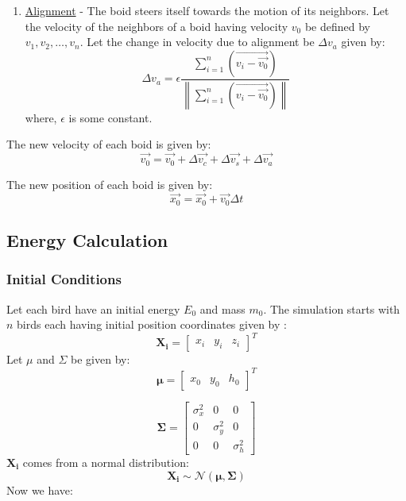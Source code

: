 \documentclass[a4paper]{article}
\newcommand\norm[1]{\left\lVert#1\right\rVert}
\begin{document}
\begin{enumerate}

\item\underline{Alignment} - The boid steers itself towards the motion of its neighbors. Let the velocity of the neighbors of a boid having velocity $v_{0}$ be defined by $v_{1}, v_{2}, \ldots, v_{n}$. Let the change in velocity due to alignment be $\Delta v_{a}$ given by:
\[ \Delta v_{a} = \epsilon \frac{\sum_{i=1}^{n}(\vec{v_{i} - \vec{v_{0}}})}{\norm{\sum_{i=1}^{n}(\vec{v_{i} - \vec{v_{0}}})}} \]
where, $\epsilon$ is some constant.


\end{enumerate}

The new velocity of each boid is given by:
\[ \vec{v_{0}} = \vec{v_{0}} + \Delta \vec{v_{c}} + \Delta \vec{v_{s}}+ \Delta \vec{v_{a}} \]

The new position of each boid is given by:
\[ \vec{x_{0}} = \vec{x_{0}} + \vec{v_{0}}\Delta t  \]

\subsection{Energy Calculation}

\subsubsection{Initial Conditions}

Let each bird have an initial energy $E_{0}$ and mass $m_{0}$.
The simulation starts with $n$ birds each having initial position coordinates  given by :
\[ \boldsymbol{X_{i}} =  \begin{bmatrix} x_{i} & y_{i} & z_{i} \end{bmatrix} ^{T} \]
Let $\mu$ and $\Sigma$ be given by:
\[ \boldsymbol\mu =  \begin{bmatrix} x_{0} & y_{0} & h_{0} \end{bmatrix} ^{T} \]

\[ \boldsymbol\Sigma =  \begin{bmatrix} 
\sigma_{x}^{2} & 0 & 0 \\
0 & \sigma_{y}^{2} & 0 \\
0 & 0 & \sigma_{h}^{2}
 \end{bmatrix} \]
$\boldsymbol{X_{i}}$ comes from a normal distribution:
\[ \boldsymbol{X_{i}} \sim \mathcal{N} (\boldsymbol\mu, \boldsymbol\Sigma) \]
Now we have:
\end{document}

